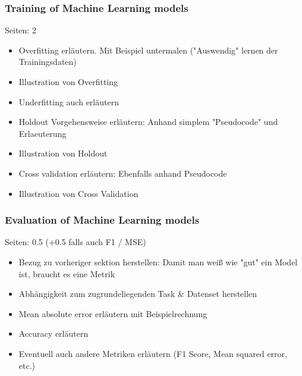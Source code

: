 \documentclass[draft,final,oneside]{vutinfth} %
\begin{document}
\subsubsection{Training of Machine Learning models}
Seiten: 2
\begin{itemize}

\item Overfitting erläutern. Mit Beispiel untermalen ("Auswendig" lernen der Trainingsdaten)
\item Illustration von Overfitting
\item Underfitting auch erläutern
\item Holdout Vorgehensweise erläutern: Anhand simplem "Pseudocode" und Erlaeuterung
\item Illustration von Holdout
\item Cross validation erläutern: Ebenfalls anhand Pseudocode
\item Illustration von Cross Validation

\end{itemize}

\subsubsection{Evaluation of Machine Learning models}
Seiten: 0.5 (+0.5 falls auch F1 / MSE)
\begin{itemize}

\item Bezug zu vorheriger sektion herstellen: Damit man weiß wie "gut" ein Model ist, braucht es eine Metrik
\item Abhängigkeit zum zugrundeliegenden Task \& Datenset herstellen
\item Mean absolute error erläutern mit Beispielrechnung
\item Accuracy erläutern
\item Eventuell auch andere Metriken erläutern (F1 Score, Mean squared error, etc.)

\end{itemize}

\fi
\end{document}
